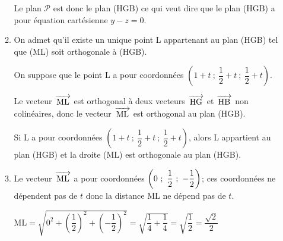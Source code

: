 \documentclass[10pt,a4paper]{article}
\newcommand{\vectt}[1]{\overrightarrow{\,\mathstrut\text{#1}\,}}%
\newcommand{\ds}{\displaystyle}
\begin{document}
\begin{enumerate}
\begin{enumerate}
Le plan $\mathcal{P}$ est donc le plan (HGB) ce qui veut dire que le plan (HGB) a pour équation cartésienne $y-z=0$.

\item On admet qu'il existe un unique point L appartenant au plan (HGB) tel que (ML) soit orthogonale à (HGB).

\smallskip

On suppose que  le point L a pour coordonnées $\left (1+t~;~\dfrac{1}{2}+t~;~\dfrac{1}{2}+t\right )$.


Le vecteur $\vectt{ML}$ est orthogonal à deux vecteurs $\vectt{HG}$ et $\vectt{HB}$ non colinéaires, donc le  vecteur $\vectt{ML}$ est orthogonal au plan (HGB).

Si L a pour coordonnées $\left (1+t~;~\dfrac{1}{2}+t~;~\dfrac{1}{2}+t\right )$, alors L appartient au plan (HGB) et la droite (ML) est orthogonale au plan (HGB).

\item %
Le vecteur $\vectt{ML}$ a pour coordonnées $\left( 0~;~\dfrac{1}{2}~;~-\dfrac{1}{2}\strut\right )$; ces coordonnées ne dépendent pas de $t$ donc la distance ML ne dépend pas de $t$. 

$\text{ML} = \ds\sqrt{0^2 + \left (\dfrac{1}{2}\right )^2 + \left ( -\dfrac{1}{2}\right )^2}
= \ds\sqrt{\dfrac{1}{4}+\dfrac{1}{4}}= \ds\sqrt{\dfrac{1}{2}} = \ds\dfrac{\sqrt{2}}{2}$


\end{enumerate}
\end{enumerate}
\end{document}
